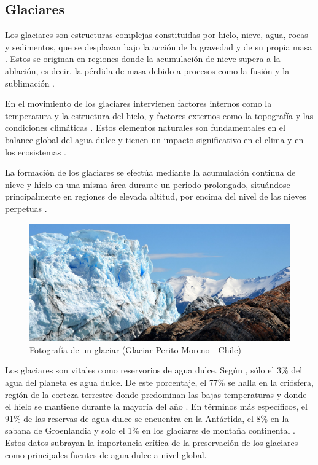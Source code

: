 \subsection{Glaciares}

Los glaciares son estructuras complejas constituidas por hielo, nieve, agua, rocas y sedimentos, que se desplazan bajo la acción de la gravedad y de su propia masa \cite{cuffey2010physics}. Estos se originan en regiones donde la acumulación de nieve supera a la ablación, es decir, la pérdida de masa debido a procesos como la fusión y la sublimación \cite{griggs2002climate}.

En el movimiento de los glaciares intervienen factores internos como la temperatura y la estructura del hielo, y factores externos como la topografía y las condiciones climáticas \cite{benn2010glaciers}. Estos elementos naturales son fundamentales en el balance global del agua dulce y tienen un impacto significativo en el clima y en los ecosistemas \cite{kargel2014global}.

La formación de los glaciares se efectúa mediante la acumulación continua de nieve y hielo en una misma área durante un periodo prolongado, situándose principalmente en regiones de elevada altitud, por encima del nivel de las nieves perpetuas \cite{houghton2001climate}.

\begin{figure}[H]
    \begin{center}
        \includegraphics[width=1\textwidth]{Images/GlaciaresFotografia.png}
    \end{center}
    \caption{Fotografía de un glaciar (Glaciar Perito Moreno - Chile)}
    \label{fig:Glaciar}
\end{figure}

Los glaciares son vitales como reservorios de agua dulce. Según , sólo el 3\% del agua del planeta es agua dulce. De este porcentaje, el 77\% se halla en la criósfera, región de la corteza terrestre donde predominan las bajas temperaturas y donde el hielo se mantiene durante la mayoría del año \cite{ermolin2015ambientes}. En términos más específicos, el 91\% de las reservas de agua dulce se encuentra en la Antártida, el 8\% en la sabana de Groenlandia y solo el 1\% en los glaciares de montaña continental \cite{benn2010glaciers}. Estos datos subrayan la importancia crítica de la preservación de los glaciares como principales fuentes de agua dulce a nivel global.

